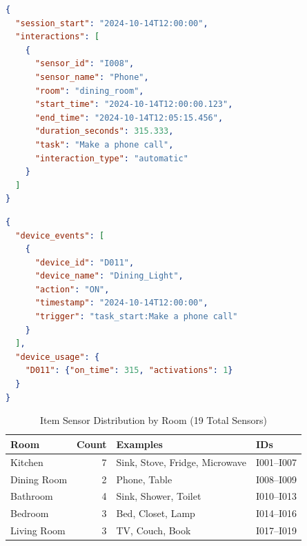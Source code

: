 \begin{lstlisting}[language=json,caption={Detailed Interaction Log (JSON)},label={lst:interaction_json}]
{
  "session_start": "2024-10-14T12:00:00",
  "interactions": [
    {
      "sensor_id": "I008",
      "sensor_name": "Phone",
      "room": "dining_room",
      "start_time": "2024-10-14T12:00:00.123",
      "end_time": "2024-10-14T12:05:15.456",
      "duration_seconds": 315.333,
      "task": "Make a phone call",
      "interaction_type": "automatic"
    }
  ]
}
\end{lstlisting}

\begin{lstlisting}[language=json,caption={SmartThings Device Control Log},label={lst:device_log}]
{
  "device_events": [
    {
      "device_id": "D011",
      "device_name": "Dining_Light",
      "action": "ON",
      "timestamp": "2024-10-14T12:00:00",
      "trigger": "task_start:Make a phone call"
    }
  ],
  "device_usage": {
    "D011": {"on_time": 315, "activations": 1}
  }
}
\end{lstlisting}



\begin{table}[t]
\centering
\caption{Item Sensor Distribution by Room (19 Total Sensors)}
\label{tab:sensor_summary}
\begin{tabular}{@{}lrll@{}}
\toprule
\textbf{Room} & \textbf{Count} & \textbf{Examples} & \textbf{IDs} \\
\midrule
Kitchen & 7 & Sink, Stove, Fridge, Microwave & I001--I007 \\
Dining Room & 2 & Phone, Table & I008--I009 \\
Bathroom & 4 & Sink, Shower, Toilet & I010--I013 \\
Bedroom & 3 & Bed, Closet, Lamp & I014--I016 \\
Living Room & 3 & TV, Couch, Book & I017--I019 \\
\bottomrule
\end{tabular}
\end{table}


